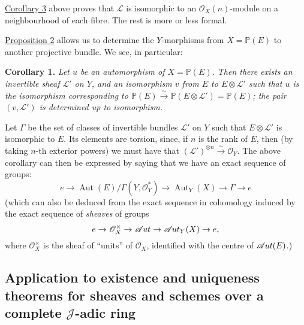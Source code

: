 \documentclass{article}
\newenvironment{itenv}[1]
  {\phantomsection\par\smallskip\noindent\textbf{#1.}\itshape}
  {\par\smallskip}
\newcommand{\oldpage}[1]{\marginpar{\footnotesize$\Big\vert$ \textit{p.~#1}}}
\theoremstyle{definition}
\theoremstyle{definition}
\theoremstyle{definition}
\theoremstyle{definition}
\theoremstyle{remark}
\begin{document}
\protect\hyperlink{fga-2-theorem-7-corollary-3}{Corollary 3} above proves that \({\mathscr{L}}\) is isomorphic to an \({\mathscr{O}}_X(n)\)-module on a neighbourhood of each fibre.
The rest is more or less formal.

\protect\hyperlink{fga-2-proposition-2}{Proposition 2} allows us to determine the \(Y\)-morphisms from \(X=\mathbb{P}(E)\) to another projective bundle.
We see, in particular:

\leavevmode{}%
\begin{itenv}{Corollary 1}
Let \(u\) be an automorphism of \(X=\mathbb{P}(E)\).
Then there exists an invertible sheaf \({\mathscr{L}}'\) on \(Y\), and an isomorphism \(v\) from \(E\) to \(E\otimes{\mathscr{L}}'\) such that \(u\) is the isomorphism corresponding to \(\mathbb{P}(E)\xrightarrow{\sim}\mathbb{P}(E\otimes{\mathscr{L}}')=\mathbb{P}(E)\);
the pair \((v,{\mathscr{L}}')\) is determined up to isomorphism.

\end{itenv}

Let \(\Gamma\) be the set of classes of invertible bundles \({\mathscr{L}}'\) on \(Y\) such that \(E\otimes{\mathscr{L}}'\) is isomorphic to \(E\).
Its elements are torsion, since, if \(n\) is the rank of \(E\), then (by taking \(n\)-th exterior powers) we must have that \(({\mathscr{L}}')^{\otimes n}\xrightarrow{\sim}{\mathscr{O}}_Y\).
The above corollary can then be expressed by saying that we have an exact sequence of groups:
\[
  e \to \operatorname{Aut}(E)/\Gamma(Y,{\mathscr{O}}_Y^*) \to \operatorname{Aut}_Y(X) \to \Gamma \to e
\]
\oldpage{182-11}(which can also be deduced from the exact sequence in cohomology induced by the exact sequence of \emph{sheaves} of groups
\[
  e \to {\mathscr{O}}_X^\times \to \mathscr{A}\kern -.5pt ut\to \mathscr{A}\kern -.5pt ut_Y(X) \to e,
\]
where \({\mathscr{O}}_X^\times\) is the sheaf of ``units'' of \({\mathscr{O}}_X\), identified with the centre of \(\mathscr{A}\kern -.5pt ut(E)\).)

\hypertarget{fga-2-section-6}{%
\subsection{\texorpdfstring{Application to existence and uniqueness theorems for sheaves and schemes over a complete \(\mathscr{J}\)-adic ring}{Application to existence and uniqueness theorems for sheaves and schemes over a complete \textbackslash mathscr\{J\}-adic ring}}\label{fga-2-section-6}}
\end{document}
